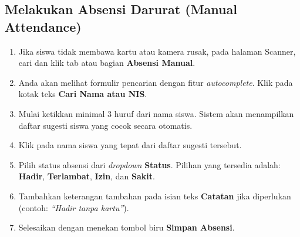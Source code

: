 \subsection{Melakukan Absensi Darurat (Manual Attendance)}
\begin{enumerate}
    \item Jika siswa tidak membawa kartu atau kamera rusak, pada halaman Scanner, cari dan klik tab atau bagian \textbf{Absensi Manual}.
    \item Anda akan melihat formulir pencarian dengan fitur \textit{autocomplete}. Klik pada kotak teks \textbf{Cari Nama atau NIS}.
    \item Mulai ketikkan minimal 3 huruf dari nama siswa. Sistem akan menampilkan daftar sugesti siswa yang cocok secara otomatis.
    \item Klik pada nama siswa yang tepat dari daftar sugesti tersebut.
    \item Pilih status absensi dari \textit{dropdown} \textbf{Status}. Pilihan yang tersedia adalah: \textbf{Hadir}, \textbf{Terlambat}, \textbf{Izin}, dan \textbf{Sakit}.
    \item Tambahkan keterangan tambahan pada isian teks \textbf{Catatan} jika diperlukan (contoh: \textit{``Hadir tanpa kartu''}).
    \item Selesaikan dengan menekan tombol biru \textbf{Simpan Absensi}.
\end{enumerate}

